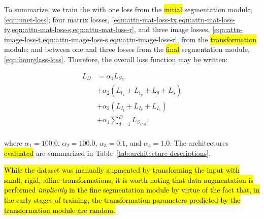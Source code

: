 To summarize, we train the \omeganet{} with one loss from the \hl{initial} segmentation module, \cref{eqn:unet-loss}; four matrix losses, \cref{eqn:attn-mat-loss-tx,eqn:attn-mat-loss-ty,eqn:attn-mat-loss-s,eqn:attn-mat-loss-r}, and three image losses, \cref{eqn:attn-image-loss-t,eqn:attn-image-loss-s,eqn:attn-image-loss-r}, from the \hl{transformation} module; and between one and three losses from the \hl{final} segmentation module, \cref{eqn:hourglass-loss}.  Therefore, the overall loss function may be written:

\begin{equation}
\begin{aligned}
L_\Omega & = \alpha_1 L_{S_U} \\
  & + \alpha_2 (L_{t_x} + L_{t_y} + L_{\theta}+ L_{s}) \\
  & + \alpha_3 (L_{I_t} + L_{I_\theta} + L_{I_s}) \\
  & + \alpha_4 \sum_{d=1}^D L_{S_{H,d}}, \\
\end{aligned}
\end{equation}

\noindent where $\alpha_1 = 100.0$, $\alpha_2 = 100.0$, $\alpha_3 = 0.1$, and $\alpha_4 = 1.0$.
The architectures \hl{evaluated} are summarized in Table~\ref{tab:architecture-descriptions}.

\hl{
While the dataset was manually augmented by transforming the input with small, rigid, affine transformations, it is worth noting that data augmentation is performed \emph{implicitly} in the fine segmentation module by virtue of the fact that, in the early stages of training, the transformation parameters predicted by the transformation module are random.
}

